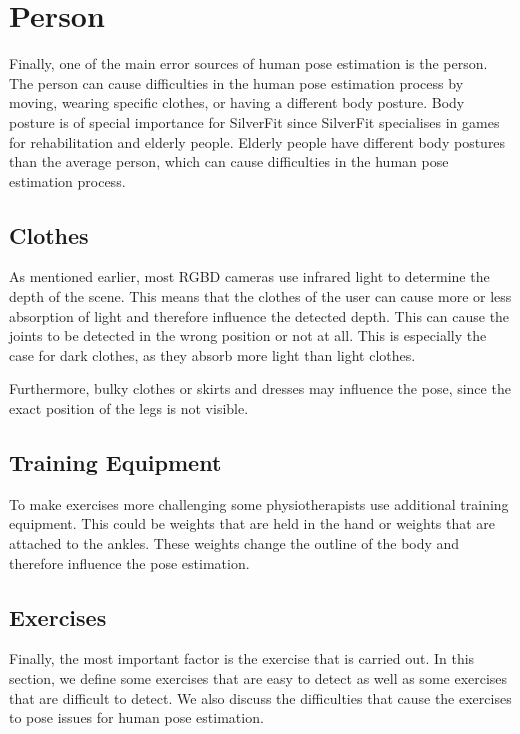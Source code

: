 \section{Person}

Finally, one of the main error sources of human pose estimation is the person. The person can cause difficulties in the human pose estimation process by moving, wearing specific clothes, or having a different body posture. Body posture is of special importance for SilverFit since SilverFit specialises in games for rehabilitation and elderly people. Elderly people have different body postures than the average person, which can cause difficulties in the human pose estimation process.

\subsection{Clothes}

As mentioned earlier, most RGBD cameras use infrared light to determine the depth of the scene. This means that the clothes of the user can cause more or less absorption of light and therefore influence the detected depth. This can cause the joints to be detected in the wrong position or not at all. This is especially the case for dark clothes, as they absorb more light than light clothes.

Furthermore, bulky clothes or skirts and dresses may influence the pose, since the exact position of the legs is not visible.

\subsection{Training Equipment}

To make exercises more challenging some physiotherapists use additional training equipment. This could be weights that are held in the hand or weights that are attached to the ankles. These weights change the outline of the body and therefore influence the pose estimation. 

\subsection{Exercises}
\label{sec:exercises}

Finally, the most important factor is the exercise that is carried out. In this section, we define some exercises that are easy to detect as well as some exercises that are difficult to detect. We also discuss the difficulties that cause the exercises to pose issues for human pose estimation.


